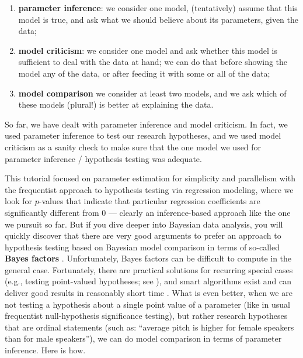 \documentclass[nobib]{tufte-handout}
\begin{document}
\begin{enumerate}
\item \textbf{parameter inference}: we consider one model, (tentatively) assume that this model is true, and ask
  what we should believe about its parameters, given the data;
\item \textbf{model criticism}: we consider one model and ask whether this model is sufficient
  to deal with the data at hand; we can do that before showing the model any of the data, or
  after feeding it with some or all of the data;
\item \textbf{model comparison} we consider at least two models, and we ask which of these models (plural!) is better at
  explaining the data.
\end{enumerate}

So far, we have dealt with parameter inference and model criticism. In fact, we used parameter
inference to test our research hypotheses, and we used model criticism as a sanity check to
make sure that the one model we used for parameter inference / hypothesis testing was adequate.

This tutorial focused on parameter estimation for simplicity and parallelism with the
frequentist approach to hypothesis testing via regression modeling, where we look for
$p$-values that indicate that particular regression coefficients are significantly different
from 0 --- clearly an inference-based approach like the one we pursuit so far.
%
%
But if you dive deeper into Bayesian data analysis, you will quickly discover that there are
very good arguments
\citep[e.g.][]{VandekerckhoveMatzke2015:Model-Compariso}
to prefer an approach to hypothesis testing based on Bayesian model comparison in terms of
so-called \textbf{Bayes factors}
\citep{Jeffreys1961:Theory-of-Proba,KassRaftery1995:Bayes-Factors}.
%
Unfortunately, Bayes factors can be difficult to compute in the general case.
%
Fortunately, there are practical solutions for recurring special cases (e.g., testing
point-valued hypotheses; see \citet{WagenmakersLodewyckx2010:Bayesian-hypoth}), and smart
algorithms exist and can deliver good results in reasonably short time
\citep[e.g.][]{GronauSarafoglou2017:A-tutorial-on-b}.
% 
What is even better, when we are not testing a hypothesis about a single point value of a
parameter (like in usual frequentist null-hypothesis significance testing), but rather research
hypotheses that are ordinal statements (such as: ``average pitch is higher for female speakers
than for male speakers''), we can do model comparison in terms of parameter inference.
%
Here is how.
\end{document}
